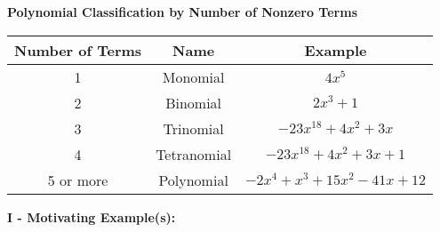 \documentclass[12pt]{article}
\theoremstyle{definition}
\begin{document}
\par
\begin{center}
{\bf Polynomial Classification by Number of Nonzero Terms}
\par
\begin{tabular}{ | c | c | c | } 
\hline
Number of Terms & Name & Example \\ 
\hline
1 & Monomial & $4x^5$ \\ 
\hline
2 & Binomial & $2x^3 +1$ \\ 
\hline
3 & Trinomial & $-23x^{18} +4x^2+3x$ \\ 
\hline
4 & Tetranomial & $-23x^{18} +4x^2+3x + 1$ \\ 
\hline
5 or more & Polynomial & $-2x^4 + x^3 +15x^2-41x + 12$ \\ 
\hline
\end{tabular}
\end{center}

{\bf I - Motivating Example(s):}\\
\ \par
\end{document}

